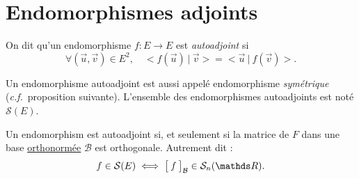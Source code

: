 \section{Endomorphismes adjoints}

\begin{defn}
	On dit qu'un endomorphisme $f : E \to E$\/ est \textit{autoadjoint} si \[
		\forall (\vec{u}, \vec{v}) \in E^2,\quad \big<f(\vec{u})\:\big|\:\vec{v}\big> = \big<\vec{u}\:\big|\:f(\vec{v})\big>
	.\] 
\end{defn}

Un endomorphisme autoadjoint est aussi appelé endomorphisme \textit{symétrique} (\textit{c.f.}\ proposition suivante). L'ensemble des endomorphismes autoadjoints est noté $\mathcal{S}(E)$.

\begin{prop}
	Un endomorphism est autoadjoint si, et seulement si la matrice de $F$\/ dans une base \ul{orthonormée} $\mathcal{B}$\/ est orthogonale.
	Autrement dit : \[
		f \in \mathcal{S}(E) \iff \big[\:f\:\big]_\mathcal{B} \in \mathcal{S}_n(\R)
	.\]
\end{prop}

